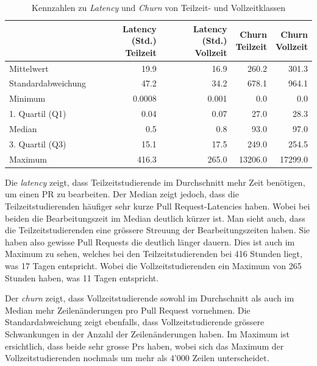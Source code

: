 \begin{table}[htbp]
    \centering
    \caption{Kennzahlen zu \textit{Latency} und \textit{Churn} von Teilzeit- und Vollzeitklassen}
    \begin{tabular}{@{}lrrrr@{}}
        \toprule
        \makecell{}&
        \makecell{\textbf{Latency (Std.)} \\ \textbf{Teilzeit}}&
        \makecell{\textbf{Latency (Std.)} \\ \textbf{Vollzeit}}&
        \makecell{\textbf{Churn} \\ \textbf{Teilzeit}}&
        \makecell{\textbf{Churn} \\ \textbf{Vollzeit}}\\
        \midrule
        Mittelwert & 19.9 & 16.9 & 260.2 & 301.3 \\
        Standardabweichung &  47.2 & 34.2  & 678.1 & 964.1 \\
        Minimum & 0.0008 & 0.001 & 0.0 & 0.0 \\
        1. Quartil (Q1) & 0.04 & 0.07 & 27.0 & 28.3\\
        Median & 0.5 & 0.8 & 93.0 & 97.0 \\
        3. Quartil (Q3) &  15.1 & 17.5 & 249.0 & 254.5 \\
        Maximum & 416.3 & 265.0 & 13206.0 & 17299.0 \\
        \bottomrule
    \end{tabular}
    \label{tab:deskriptive-kennzahlen-teilzeit-vollzeit}
\end{table}

Die \textit{latency} zeigt, dass Teilzeitstudierende im Durchschnitt mehr Zeit benötigen, um einen PR zu bearbeiten. Der Median zeigt jedoch, dass die Teilzeitstudierenden häufiger sehr kurze Pull Request-Latencies haben. Wobei bei beiden die Bearbeitungszeit im Median deutlich kürzer ist. Man sieht auch, dass die Teilzeitstudierenden eine grössere Streuung der Bearbeitungszeiten haben. Sie haben also gewisse Pull Requests die deutlich länger dauern. Dies ist auch im Maximum zu sehen, welches bei den Teilzeitstudierenden bei 416 Stunden liegt, was 17 Tagen entspricht. Wobei die Vollzeitstudierenden ein Maximum von 265 Stunden haben, was 11 Tagen entspricht.

Der \textit{churn} zeigt, dass Vollzeitstudierende sowohl im Durchschnitt als auch im Median mehr Zeilenänderungen pro Pull Request vornehmen. Die Standardabweichung zeigt ebenfalls, dass Vollzeitstudierende grössere Schwankungen in der Anzahl der Zeilenänderungen haben. Im Maximum ist ersichtlich, dass beide sehr grosse Prs haben, wobei sich das Maximum der Vollzeitstudierenden nochmals um mehr als 4'000 Zeilen unterscheidet.

